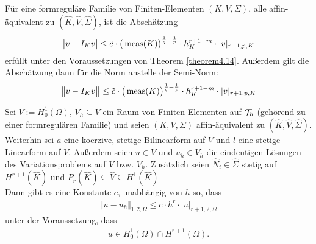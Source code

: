 \begin{theorem}\label{theorem4.16}
	Für eine formreguläre Familie von Finiten-Elementen $(K,V,\Sigma)$, alle affin-äquivalent zu $(\hat{K},\hat{V},\hat{\Sigma})$, ist die Abschätzung
	\begin{align*}
		\big| v-I_K v\big|\leq\tilde{c}\cdot\big(\operatorname{meas}(K)\big)^{\frac{1}{q}-\frac{1}{p}}\cdot h_K^{r+1-m}\cdot|v|_{r+1,p,K}
	\end{align*}
	erfüllt unter den Voraussetzungen von Theorem \ref{theorem4.14}. Außerdem gilt die Abschätzung dann für die Norm anstelle der Semi-Norm:
	\begin{align*}
		\big\Vert v-I_K v\big\Vert\leq\tilde{c}\cdot\big(\operatorname{meas}(K)\big)^{\frac{1}{q}-\frac{1}{p}}\cdot h_K^{r+1-m}\cdot|v|_{r+1,p,K}
	\end{align*}
\end{theorem}

\begin{theorem}\label{theorem4.17}
	Sei $V:=H_0^1(\Omega)$, $V_h\subseteq V$ ein Raum von Finiten Elementen auf $\mathcal{T}_h$ (gehörend zu einer formregulären Familie)  und seien $(K,V,\Sigma)$ affin-äquivalent zu $(\hat{K},\hat{V},\hat{\Sigma})$.\\
	Weiterhin sei $a$ eine koerzive, stetige Bilinearform auf $V$ und $l$ eine stetige Linearform auf $V$.
	Außerdem seien $u\in V$ und $u_h\in V_h$ die 	eindeutigen Lösungen des Variationsproblems auf $V$ bzw. $V_h$.
	Zusätzlich seien $\hat{N}_i\in\hat{\Sigma}$ stetig auf $H^{r+1}(\hat{K})$ und $P_r(\hat{K})\subseteq\hat{V}\subseteq H^1(\hat{K})$\\
	Dann gibt es eine Konstante $c$, unabhängig von $h$ so, dass
	\begin{align*}
		\Vert u-u_h\Vert_{1,2,\Omega}\leq c\cdot h^r\cdot|u|_{r+1,2,\Omega}
	\end{align*}
	unter der Voraussetzung, dass
	\begin{align*}
		u\in H^1_0(\Omega)\cap H^{r+1}(\Omega).
	\end{align*}
\end{theorem}

